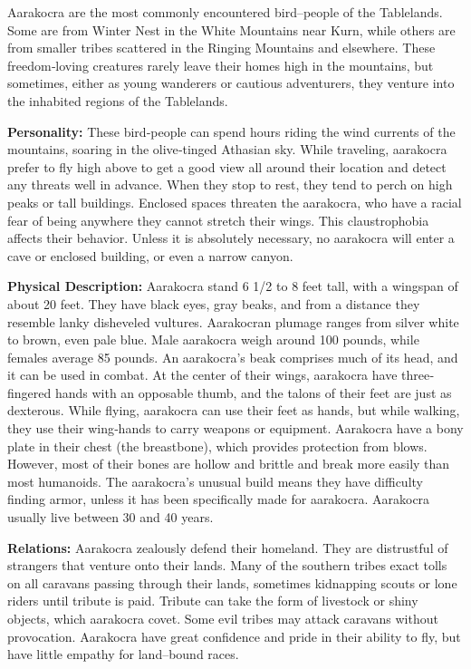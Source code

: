 \documentclass[10pt,a4paper,twocolumn]{d20}
\begin{document}
Aarakocra are the most commonly encountered bird–people of the Tablelands. Some are from Winter Nest in the White Mountains near Kurn, while others are from smaller tribes scattered in the Ringing Mountains and elsewhere. These freedom‐loving creatures rarely leave their homes high in the mountains, but sometimes, either as young wanderers or cautious adventurers, they venture into the inhabited regions of the Tablelands.

\textbf{Personality:} These bird‐people can spend hours riding the wind currents of the mountains, soaring in the olive‐tinged Athasian sky. While traveling, aarakocra prefer to fly high above to get a good view all around their location and detect any threats well in advance. When they stop to rest, they tend to perch on high peaks or tall buildings. Enclosed spaces threaten the aarakocra, who have a racial fear of being anywhere they cannot stretch their wings. This claustrophobia affects their behavior. Unless it is absolutely necessary, no aarakocra will enter a cave or enclosed building, or even a narrow canyon.

\textbf{Physical Description:} Aarakocra stand 6 1/2 to 8 feet tall, with a wingspan of about 20 feet. They have black eyes, gray beaks, and from a distance they resemble lanky disheveled vultures. Aarakocran plumage ranges from silver white to brown, even pale blue. Male aarakocra weigh around 100 pounds, while females average 85 pounds. An aarakocra’s beak comprises much of its head, and it can be used in combat. At the center of their wings, aarakocra have three‐fingered hands with an opposable thumb, and the talons of their feet are just as dexterous. While flying, aarakocra can use their feet as hands, but while walking, they use their wing‐hands to carry weapons or equipment. Aarakocra have a bony plate in their chest (the breastbone), which provides protection from blows. However, most of their bones are hollow and brittle and break more easily than most humanoids. The aarakocra’s unusual build means they have difficulty finding armor, unless it has been specifically made for aarakocra. Aarakocra usually live between 30 and 40 years.

\textbf{Relations:} Aarakocra zealously defend their homeland. They are distrustful of strangers that venture onto their lands. Many of the southern tribes exact tolls on all caravans passing through their lands, sometimes kidnapping scouts or lone riders until tribute is paid. Tribute can take the form of livestock or shiny objects, which aarakocra covet. Some evil tribes may attack caravans without provocation. Aarakocra have great confidence and pride in their ability to fly, but have little empathy for land–bound races.
\end{document}
